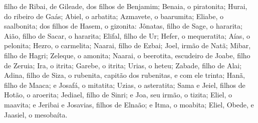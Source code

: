 filho de Ribai, de Gileade, dos filhos de Benjamim; Benaia, o
piratonita; Hurai, do ribeiro de Gaás; Abiel, o arbatita;
Azmavete, o baarumita; Eliabe, o saalbonita; dos
filhos de Hasem, o gizonita: Jônatas, filho de Sage, o hararita;
Aião, filho de Sacar, o hararita; Elifal, filho de Ur;
Hefer, o mequeratita; Aías, o pelonita; Hezro, o
carmelita; Naarai, filho de Ezbai; Joel, irmão de Natã;
Mibar, filho de Hagri; Zeleque, o amonita; Naarai, o
beerotita, escudeiro de Joabe, filho de Zeruia; Ira, o
itrita; Garebe, o itrita; Urias, o heteu; Zabade, filho de
Alai; Adina, filho de Siza, o rubenita, capitão dos
rubenitas, e com ele trinta; Hanã, filho de Maaca; e Josafá,
o mitatita; Uzias, o asteratita; Sama e Jeiel, filhos de
Hotão, o aroerita; Jediael, filho de Sinri; e Joa, seu irmão,
o tizita; Eliel, o maavita; e Jeribai e Josavias, filhos de
Elnaão; e Itma, o moabita; Eliel, Obede, e Jaasiel, o
mesobaíta.

\medskip

